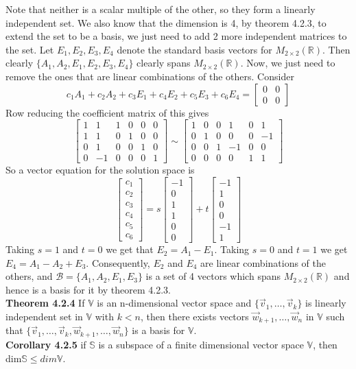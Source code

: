 \documentclass[10pt,letter]{article}
\begin{document}
Note that neither is a scalar multiple of the other, so they form a linearly independent set. We also know that the dimension is 4, by theorem 4.2.3, to extend the set to be a basis, we just need to add 2 more independent matrices to the set. Let $E_1,E_2,E_3,E_4$ denote the standard basis vectors for $M_{2\times 2}(\mathbb{R})$. Then clearly $\{A_1,A_2,E_1,E_2,E_3,E_4\}$ clearly spans $M_{2\times 2}(\mathbb{R})$. Now, we just need to remove the ones that are linear combinations of the others. Consider $$c_1A_1+c_2A_2+c_3E_1+c_4E_2+c_5E_3+c_6E_4=\begin{bmatrix}0&0\\0&0\end{bmatrix}$$ Row reducing the coefficient matrix of this gives $$\begin{bmatrix}1&1&1&0&0&0\\1&1&0&1&0&0\\0&1&0&0&1&0\\0&-1&0&0&0&1\end{bmatrix}\sim\begin{bmatrix}1&0&0&1&0&1\\0&1&0&0&0&-1\\0&0&1&-1&0&0\\0&0&0&0&1&1\end{bmatrix}$$ So a vector equation for the solution space is $$\begin{bmatrix}c_1\\c_2\\c_3\\c_4\\c_5\\c_6\end{bmatrix}=s\begin{bmatrix}-1\\0\\1\\1\\0\\0\end{bmatrix}+t\begin{bmatrix}-1\\1\\0\\0\\-1\\1\end{bmatrix}$$ Taking $s=1$ and $t=0$ we get that $E_2=A_1-E_1$. Taking $s=0$ and $t=1$ we get $E_4=A_1-A_2+E_3$. Consequently, $E_2$ and $E_4$ are linear combinations of the others, and $\mathcal{B}=\{A_1,A_2,E_1,E_3\}$ is a set of 4 vectors which spans $M_{2\times 2}(\mathbb{R})$ and hence is a basis for it by theorem 4.2.3.\\ 
\textbf{Theorem 4.2.4} If $\mathbb{V}$ is an n-dimensional vector space and $\{\vec{v}_1,\ldots,\vec{v}_k\}$ is linearly independent set in $\mathbb{V}$ with $k<n$, then there exists vectors $\vec{w}_{k+1},\ldots,\vec{w}_n$ in $\mathbb{V}$ such that $\{\vec{v}_1,\ldots,\vec{v}_k,\vec{w}_{k+1},\ldots,\vec{w}_n\}$ is a basis for $\mathbb{V}$. \\ 
\textbf{Corollary 4.2.5} if $\mathbb{S}$ is a subspace of a finite dimensional vector space $\mathbb{V}$, then dim$\mathbb{S}\leq dim\mathbb{V}$. 
\end{document}
